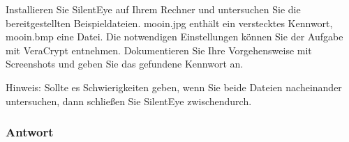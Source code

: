 \documentclass{article}
\begin{document}
Installieren Sie SilentEye  auf Ihrem Rechner und untersuchen Sie die 
bereitgestellten Beispieldateien. mooin.jpg enthält ein verstecktes Kennwort, 
mooin.bmp eine Datei. Die notwendigen Einstellungen können Sie der Aufgabe mit 
VeraCrypt entnehmen. Dokumentieren Sie Ihre Vorgehensweise mit Screenshots und 
geben Sie das gefundene Kennwort an.

Hinweis: Sollte es Schwierigkeiten geben, wenn Sie beide Dateien nacheinander 
untersuchen, dann schließen Sie SilentEye zwischendurch.

\subsubsection*{Antwort}
\end{document}
